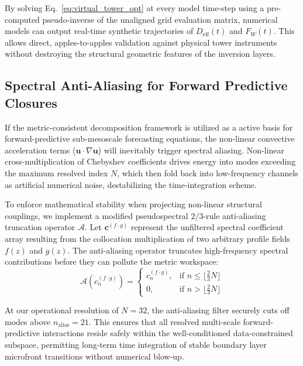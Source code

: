\documentclass[11pt,a4paper]{article}
\begin{document}
By solving Eq.~\ref{eq:virtual_tower_opt} at every model time-step using a pre-computed pseudo-inverse of the unaligned grid evaluation matrix, numerical models can output real-time synthetic trajectories of $D_{\mathrm{eff}}(t)$ and $F_W(t)$. This allows direct, apples-to-apples validation against physical tower instruments without destroying the structural geometric features of the inversion layers.

\subsection{Spectral Anti-Aliasing for Forward Predictive Closures}
\label{sec:extensions:antialias}

If the metric-consistent decomposition framework is utilized as a active basis for forward-predictive sub-mesoscale forecasting equations, the non-linear convective acceleration terms ($\mathbf{u} \cdot \nabla \mathbf{u}$) will inevitably trigger spectral aliasing. Non-linear cross-multiplication of Chebyshev coefficients drives energy into modes exceeding the maximum resolved index $N$, which then fold back into low-frequency channels as artificial numerical noise, destabilizing the time-integration scheme.

To enforce mathematical stability when projecting non-linear structural couplings, we implement a modified pseudospectral $2/3$-rule anti-aliasing truncation operator $\mathcal{A}$. Let $\mathbf{c}^{(f \cdot g)}$ represent the unfiltered spectral coefficient array resulting from the collocation multiplication of two arbitrary profile fields $f(z)$ and $g(z)$. The anti-aliasing operator truncates high-frequency spectral contributions before they can pollute the metric workspace:
\begin{equation}
\mathcal{A}\left(c_n^{(f \cdot g)}\right) = \begin{cases}
c_n^{(f \cdot g)}, & \text{if } n \le \lfloor \frac{2}{3}N \rfloor \\
0, & \text{if } n > \lfloor \frac{2}{3}N \rfloor
\end{cases}
\label{eq:two_thirds_rule}
\end{equation}

At our operational resolution of $N=32$, the anti-aliasing filter securely cuts off modes above $n_{\text{alias}} = 21$. This ensures that all resolved multi-scale forward-predictive interactions reside safely within the well-conditioned data-constrained subspace, permitting long-term time integration of stable boundary layer microfront transitions without numerical blow-up.
\end{document}
